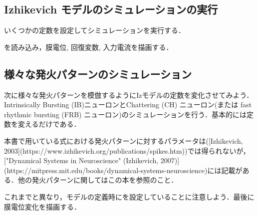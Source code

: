 \subsection{Izhikevich モデルのシミュレーションの実行}
いくつかの定数を設定してシミュレーションを実行する．

を読み込み，膜電位, 回復変数, 入力電流を描画する．


\subsection{様々な発火パターンのシミュレーション}
次に様々な発火パターンを模倣するようにIzモデルの定数を変化させてみよう．Intrinsically Bursting (IB)ニューロンとChattering (CH) ニューロン(または fast rhythmic bursting (FRB) ニューロン)のシミュレーションを行う．基本的には定数を変えるだけである．

本書で用いている式における発火パターンに対するパラメータは([Izhikevich, 2003](https://www.izhikevich.org/publications/spikes.htm))では得られないが，["Dynamical Systems in Neuroscience" (Izhikevich, 2007)](https://mitpress.mit.edu/books/dynamical-systems-neuroscience)には記載がある．他の発火パターンに関してはこの本を参照のこと．

これまでと異なり，モデルの定義時にを設定していることに注意しよう．最後に膜電位変化を描画する．


